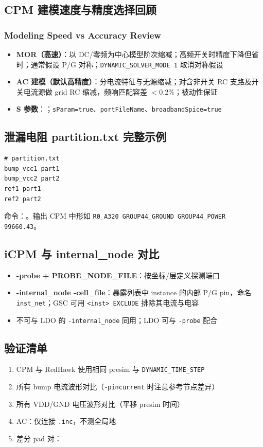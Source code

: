 \subsection{CPM 建模速度与精度选择回顾}
\subsubsection*{Modeling Speed vs Accuracy Review}

\begin{itemize}
  \item \textbf{MOR（高速）}：以 DC/零频为中心模型阶次缩减；高频开关时精度下降但省时；通常假设 P/G 对称；\texttt{DYNAMIC\_SOLVER\_MODE 1} 取消对称假设
  \item \textbf{AC 建模（默认高精度）}：分电流特征与无源缩减；对含非开关 RC 支路及开关电流源做 grid RC 缩减，频响匹配容差 $<0.2\%$；被动性保证
  \item \textbf{S 参数}：；\texttt{sParam=true}、\texttt{portFileName}、\texttt{broadbandSpice=true}
\end{itemize}

\subsection{泄漏电阻 partition.txt 完整示例}
\begin{lstlisting}
# partition.txt
bump_vcc1 part1
bump_vcc2 part2
ref1 part1
ref2 part2
\end{lstlisting}
命令：。输出 CPM 中形如 \texttt{R0\_A320 GROUP44\_GROUND GROUP44\_POWER 99660.43}。

\subsection{iCPM 与 internal\_node 对比}
\begin{itemize}
  \item \textbf{-probe + PROBE\_NODE\_FILE}：按坐标/层定义探测端口
  \item \textbf{-internal\_node -cell\_file}：暴露列表中 instance 的内部 P/G pin，命名 \texttt{inst\_net}；GSC 可用 \texttt{<inst> EXCLUDE} 排除其电流与电容
  \item 不可与 LDO 的 \texttt{-internal\_node} 同用；LDO 可与 \texttt{-probe} 配合
\end{itemize}

\subsection{验证清单}
\begin{enumerate}
  \item CPM 与 RedHawk 使用相同 presim 与 \texttt{DYNAMIC\_TIME\_STEP}
  \item 所有 bump 电流波形对比（\texttt{-pincurrent} 时注意参考节点差异）
  \item 所有 VDD/GND 电压波形对比（平移 presim 时间）
  \item AC：仅连接 \texttt{.inc}，不测全局地
  \item 差分 pad 对：
\end{enumerate}

